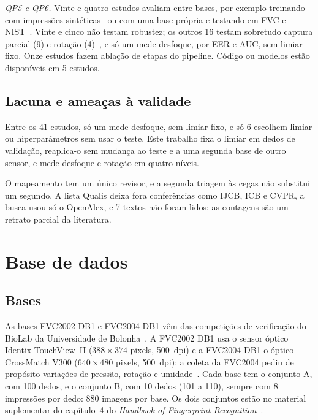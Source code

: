 \documentclass[conference]{IEEEtran}
\newcommand{\mapIncl}{41}
\newcommand{\mapPend}{7}
\begin{document}
\emph{QP5 e QP6.} Vinte e quatro estudos avaliam entre bases, por exemplo treinando com impressões sintéticas~\cite{engelsma2022printsgan} ou com uma base própria e testando em FVC e NIST~\cite{liu2019aligned}. Vinte e cinco não testam robustez; os outros 16 testam sobretudo captura parcial (9) e rotação (4)~\cite{guan2024jipnet}, e só um mede desfoque, por EER e AUC, sem limiar fixo. Onze estudos fazem ablação de etapas do pipeline. Código ou modelos estão disponíveis em 5 estudos.

\subsection{Lacuna e ameaças à validade}

Entre os \mapIncl{} estudos, só um mede desfoque, sem limiar fixo, e só 6 escolhem limiar ou hiperparâmetros sem usar o teste. Este trabalho fixa o limiar em dedos de validação, reaplica-o sem mudança ao teste e a uma segunda base de outro sensor, e mede desfoque e rotação em quatro níveis.

O mapeamento tem um único revisor, e a segunda triagem às cegas não substitui um segundo. A lista Qualis deixa fora conferências como IJCB, ICB e CVPR, a busca usou só o OpenAlex, e \mapPend{} textos não foram lidos; as contagens são um retrato parcial da literatura.


\section{Base de dados}
\label{sec:dados}

\subsection{Bases}

As bases FVC2002 DB1 e FVC2004 DB1 vêm das competições de verificação do BioLab da Universidade de Bolonha~\cite{maio2002fvc2002,maio2004fvc2004}. A FVC2002 DB1 usa o sensor óptico Identix TouchView~II ($388\times374$ pixels, 500~dpi) e a FVC2004 DB1 o óptico CrossMatch V300 ($640\times480$ pixels, 500~dpi); a coleta da FVC2004 pediu de propósito variações de pressão, rotação e umidade~\cite{maio2004fvc2004}. Cada base tem o conjunto A, com 100 dedos, e o conjunto B, com 10 dedos (101 a 110), sempre com 8 impressões por dedo: \num{880} imagens por base. Os dois conjuntos estão no material suplementar do capítulo~4 do \emph{Handbook of Fingerprint Recognition}~\cite{maltoni2022handbook}.
\end{document}
